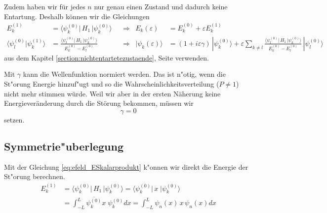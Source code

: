 \begin{refsection}
Zudem haben wir f\"ur jedes $n$ nur genau einen Zustand und dadurch keine Entartung. 
Deshalb k\"onnen wir die Gleichungen
\begin{equation}
\begin{aligned}
E_k^{(1)} &=
\langle \psi_k^{(0)}|\, H_1 \,|\psi_k^{(0)}\rangle
&&\Longrightarrow
& E_k(\varepsilon)&=E_k^{(0)} + \varepsilon E_k^{(1)}
\\
\langle\psi_l^{(0)}|\psi_k^{(1)}\rangle
&=
\frac{\langle \psi_l^{(0)}|\, H_1 \,|\psi_k^{(0)}\rangle}{E_k^{(0)}-E_l^{(0)}}
&&\Longrightarrow
& |\psi_k(\varepsilon)\rangle &=
(1+i\varepsilon \gamma)
\,|\psi_k^{(0)}\rangle
+
\varepsilon
\sum_{k\ne l}
\frac{\langle \psi_l^{(0)}|\, H_1 \,|\psi_k^{(0)}\rangle}{E_k^{(0)}-E_l^{(0)}}
\,
|\psi_l^{(0)}\rangle
\label{eq:efeld_ESkalarprodukt}
\end{aligned}
\end{equation}
aus dem Kapitel \ref{section:nichtentartetezustaende}, Seite \pageref{section:nichtentartetezustaende} verwenden.

Mit $\gamma$ kann die Wellenfunktion normiert werden.
Das ist n"otig, wenn die St"orung Energie hinzuf"ugt
und so die Wahrscheinlichkeitsverteilung ($P \ne 1$) nicht mehr stimmen w\"urde.
Weil wir aber in der ersten N\"aherung keine 
Energiever\"anderung durch die St\"orung bekommen, m\"ussen wir
\[
  \gamma = 0
\]
setzen.




\subsection{Symmetrie"uberlegung}
Mit der Gleichung \ref{eq:efeld_ESkalarprodukt} k"onnen wir direkt die Energie der St"orung berechnen.
\begin{equation}
\begin{aligned}
  E_{k}^{(1)} 
 &= \langle \psi_k^{(0)}|\, H_1 \,|\psi_k^{(0)}\rangle 
  = \langle \psi_k^{(0)}|\, x \;|\psi_k^{(0)}\rangle                   \\
 &= \int_{-L}^{L} \overline{\psi_k^{(0)}} x \; \psi_k^{(0)} dx
  = \int_{-L}^{L} \psi_n(x) \, x \, \psi_n(x) dx
\end{aligned}
\end{equation}


\end{refsection}
